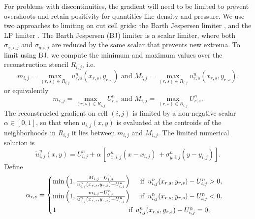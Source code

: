 For problems with discontinuities, the gradient will need to be limited
to prevent overshoots and retain positivity for quantities like density and
pressure.
We use two approaches to limiting on cut cell grids: the Barth Jespersen limiter \cite{barth-jespersen}, and the LP limiter \cite{May_Berger_LP}.
The Barth Jespersen (BJ) limiter is a scalar limiter, where both $\sigma_{x,i,j}$ and $\sigma_{y,i,j}$ are reduced by the same scalar that prevents new extrema.  
To limit using BJ, we compute the minimum and maximum values over the reconstruction stencil $R_{i,j}$, i.e.
\begin{equation} 
     m_{i,j} = \max_{(r,s) \in R_{i,j}} u^n_{r,s}(x_{r,s}, y_{r,s}) \text{ and } 
     M_{i,j} = \max_{(r,s) \in R_{i,j}} u^n_{r,s}(x_{r,s}, y_{r,s}).
\label{eqn:bj}
\end{equation}
or equivalently
\begin{equation} 
m_{i,j} = \max_{(r,s) \in R_{i,j}} U^n_{r,s} \text{ and } 
M_{i,j} = \max_{(r,s) \in R_{i,j}} U^n_{r,s}.
\label{eqn:bj1}
\end{equation}
The reconstructed gradient on cell $(i,j)$ is limited by a non-negative 
scalar $\alpha \in [0,1]$, so that when ${u}_{i,j}(x,y)$ 
is evaluated at the centroids of the neighborhoods in $R_{i,j}$ it
lies between $m_{i,j}$ and $M_{i,j}$.
The limited numerical solution is
\begin{equation}
     \tilde{u}^n_{i,j}(x,y) = U_{i,j}^n + \alpha \, [{\sigma}^n_{x,i,j} ( x -  x_{i,j}) \, 
   + {\sigma}^n_{y,i,j}( y -  y_{i,j})].
\end{equation}
Define
\begin{equation}\label{eq:bj_alpha}
    \alpha_{r,s} = \begin{cases}
           \min \left(1,\frac{M_{i,j}-U_{i,j}^n}{u^n_{i,j}(x_{r,s},y_{r,s}) - U_{i,j}^n} \right)
    \quad  \text{ if } \,  u^n_{i,j}( x_{r,s},  y_{r,s}) - U_{i,j}^n >  0,\\[.08in]
            \min \left(1, \frac{m_{i,j}-U_{i,j}^n}{u^n_{i,j}(x_{r,s},y_{r,s}) - U_{i,j}^n} \right)  
    \quad  \text{ if }  \, u^n_{i,j}(x_{r,s}, y_{r,s}) - U_{i,j}^n < 0.\\[.08in]
             1    \hspace*{1.45in}  \text{if} \; \, u^n_{i,j}(x_{r,s}, y_{r,s}) - U_{i,j}^n = 0,
    \end{cases}
\end{equation}
